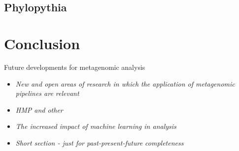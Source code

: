 \documentclass{article}
\begin{document}
\subsection{Phylopythia}

\section{Conclusion}
Future developments for metagenomic analysis
\begin{itemize}
	\item \emph{New and open areas of research in which the application of metagenomic pipelines are relevant}
	\item \emph{HMP and other }
	\item \emph{The increased impact of machine learning in analysis}
	\item \emph{Short section - just for past-present-future completeness}
\end{itemize}

\end{document}
